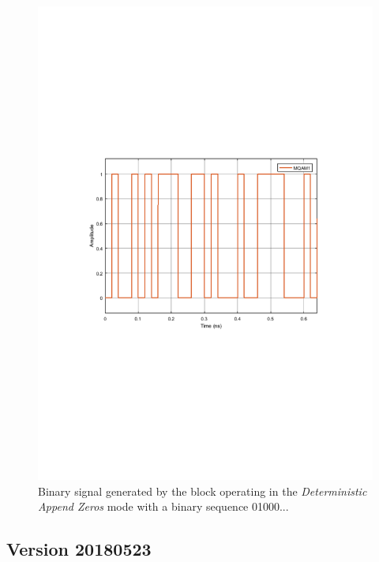 \begin{figure}
	\centering
	\includegraphics[clip, trim=0.5cm 9cm 0.5cm 9cm, width=\textwidth]{./lib/binary_source/figures/BinarySource_output.pdf}
	
	\caption{Binary signal generated by the block operating in the \textit{Deterministic Append Zeros} mode with a binary sequence 01000...}\label{MQAM1_DeterministAppendZeros}
\end{figure}

\subsection{Version 20180523}

